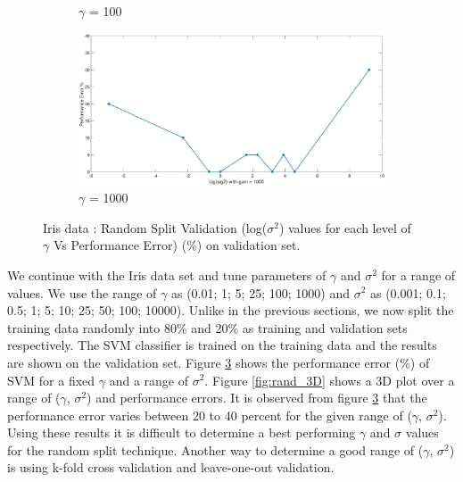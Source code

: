 {\begin{figure}[!ht]
\begin{floatrow}
{\begin{subfigure}{.3\textwidth}
			\caption{$\gamma$ = 100}
			\label{fig:rand_gamma(100)}
		\end{subfigure}%
		\begin{subfigure}{.3\textwidth}
			\includegraphics[height=0.35\linewidth,width=0.7\linewidth]{Exercise1/Report/Ex1.3_gam(1000).eps}
			\caption{$\gamma$ = 1000}
			\label{fig:rand_gamma(1000)}
		\end{subfigure}%
		}{%
			\caption{Iris data : Random Split Validation (log($\sigma^2$) values for each level of $\gamma$ Vs Performance Error)  (\%) on validation set.}\label{fig:rand_gam}
		}
	\end{floatrow}
\end{figure}

We continue with the Iris data set and tune parameters of $\gamma$ and $\sigma^2$ for a range of values. We use the range of $\gamma$ as (0.01; 1; 5; 25; 100; 1000) and $\sigma^2$ as (0.001; 0.1; 0.5; 1; 5; 10; 25; 50; 100; 10000). Unlike in the previous sections, we now split the training data randomly into 80\% and 20\% as training and validation sets respectively. The SVM classifier is trained on the training data and the results are shown on the validation set. Figure \ref{fig:rand_gam}  shows the performance error (\%) of SVM for a fixed $\gamma$ and a range of $\sigma^2$. Figure \ref{fig:rand_3D} shows a 3D plot over a range of ($\gamma$, $\sigma^2$) and performance errors. It is observed from figure \ref{fig:rand_gam} that the performance error varies between 20 to 40 percent for the given range of ($\gamma$, $\sigma^2$). Using these results it is difficult to determine a best performing $\gamma$ and $\sigma$ values for the random split technique.  Another way to determine a good range of ($\gamma$, $\sigma^2$) is using k-fold cross validation and leave-one-out validation.

}
